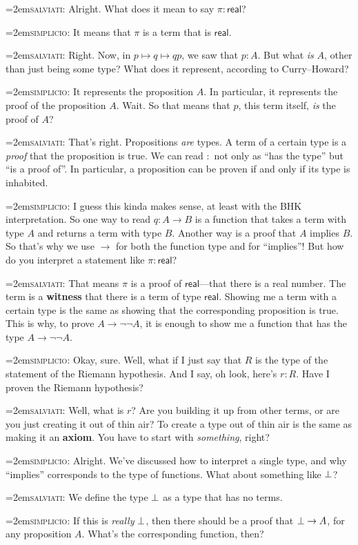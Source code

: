 \documentclass[11pt,paper=letter]{scrartcl}
\renewcommand{\sf}{\mathsf}
\renewcommand{\lnot}{\neg}
\newcommand{\simp}{\vspace{0.5em}\noindent\hangindent=2em\textsc{simplicio:} }
\newcommand{\salv}{\vspace{0.5em}\noindent\hangindent=2em\textsc{salviati:} }
\begin{document}
\salv Alright. What does it mean to say $\pi : \sf{real}$?

\simp It means that $\pi$ is a term that is $\sf{real}$.

\salv Right. Now, in $p \mapsto q \mapsto qp$, we saw that $p : A$. But what \emph{is} $A$, other than just being some type? What does it represent, according to Curry--Howard?

\simp It represents the proposition $A$. In particular, it represents the proof of the proposition $A$. Wait. So that means that $p$, this term itself, \emph{is} the proof of $A$?

\salv That's right. Propositions \emph{are} types. A term of a certain type is a \emph{proof} that the proposition is true. We can read $:$ not only as ``has the type'' but ``is a proof of''. In particular, a proposition can be proven if and only if its type is inhabited.

\simp I guess this kinda makes sense, at least with the BHK interpretation. So one way to read $q : A \to B$ is a function that takes a term with type $A$ and returns a term with type $B$. Another way is a proof that $A$ implies $B$. So that's why we use $\to$ for both the function type and for ``implies''! But how do you interpret a statement like $\pi : \sf{real}$?

\salv That means $\pi$ is a proof of $\sf{real}$---that there is a real number. The term is a \textbf{witness} that there is a term of type $\sf{real}$. Showing me a term with a certain type is the same as showing that the corresponding proposition is true. This is why, to prove $A \to \lnot\lnot A$, it is enough to show me a function that has the type $A \to \lnot\lnot A$.

\simp Okay, sure. Well, what if I just say that $R$ is the type of the statement of the Riemann hypothesis. And I say, oh look, here's $r : R$. Have I proven the Riemann hypothesis?

\salv Well, what is $r$? Are you building it up from other terms, or are you just creating it out of thin air? To create a type out of thin air is the same as making it an \textbf{axiom}. You have to start with \emph{something}, right?

\simp Alright. We've discussed how to interpret a single type, and why ``implies'' corresponds to the type of functions. What about something like $\bot$?

\salv We define the type $\bot$ as a type that has no terms.

\simp If this is \emph{really} $\bot$, then there should be a proof that $\bot \to A$, for any proposition $A$. What's the corresponding function, then?
\end{document}
